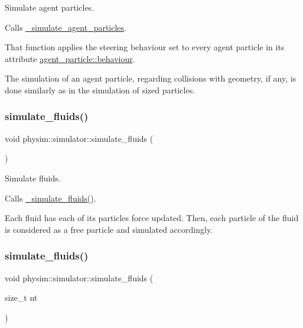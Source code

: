 Simulate agent particles. 

Calls \hyperlink{classphysim_1_1simulator_a97eef0600da8870ee590babaffff775b}{\+\_\+simulate\+\_\+agent\+\_\+particles}.

That function applies the steering behaviour set to every agent particle in its attribute \hyperlink{classphysim_1_1particles_1_1agent__particle_af219e3f46630bb7f51f3d00952ed4f1c}{agent\+\_\+particle\+::behaviour}.

The simulation of an agent particle, regarding collisions with geometry, if any, is done similarly as in the simulation of sized particles. \mbox{\label{classphysim_1_1simulator_a63f7f4b59a79b8b294aaa6d8870fccd2}} 
\subsubsection{\texorpdfstring{simulate\+\_\+fluids()}{simulate\_fluids()}\hspace{0.1cm}{\footnotesize\ttfamily [1/2]}}
{\footnotesize\ttfamily void physim\+::simulator\+::simulate\+\_\+fluids (\begin{DoxyParamCaption}{ }\end{DoxyParamCaption})}



Simulate fluids. 

Calls \hyperlink{classphysim_1_1simulator_ac01677745377a9520453b73e199fcf99}{\+\_\+simulate\+\_\+fluids()}.

Each fluid has each of its particle\textquotesingle{}s force updated. Then, each particle of the fluid is considered as a free particle and simulated accordingly. \mbox{\label{classphysim_1_1simulator_acb3359c9faedfc69191bf9a4618eebfa}} 
\subsubsection{\texorpdfstring{simulate\+\_\+fluids()}{simulate\_fluids()}\hspace{0.1cm}{\footnotesize\ttfamily [2/2]}}
{\footnotesize\ttfamily void physim\+::simulator\+::simulate\+\_\+fluids (\begin{DoxyParamCaption}\item[{size\+\_\+t}]{nt }\end{DoxyParamCaption})}



